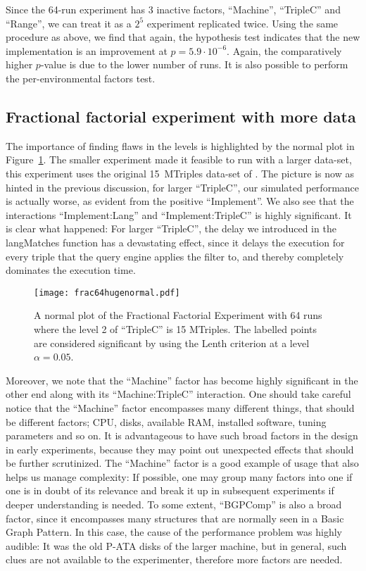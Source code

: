 \documentclass{llncs}
\begin{document}
Since the 64-run experiment has 3 inactive factors, ``Machine'',
``TripleC'' and ``Range'', we can treat it as a $2^5$ experiment
replicated twice. Using the same procedure as above, we find that
again, the hypothesis test indicates that the new implementation is an
improvement at $p = 5.9 \cdot 10^{-6}$. Again, the comparatively
higher $p$-value is due to the lower number of runs. It is also possible
to perform the per-environmental factors test.


\subsection{Fractional factorial experiment with more data}\label{sec:hugefrac}

The importance of finding flaws in the levels is highlighted by the
normal plot in Figure~\ref{fig:frac64hugenormal}. The smaller
experiment made it feasible to run with a larger data-set, this
experiment uses the original 15~MTriples data-set of
\cite{mxro:Morsey2011DBpedia}. The picture is now as hinted in the
previous discussion, for larger ``TripleC'', our simulated performance
is actually worse, as evident from the positive ``Implement''. We also
see that the interactions ``Implement:Lang'' and ``Implement:TripleC''
is highly significant. It is clear what happened: For larger
``TripleC'', the delay we introduced in the langMatches function has a
devastating effect, since it delays the execution for every triple
that the query engine applies the filter to, and thereby completely
dominates the execution time.

\begin{figure}[ht!]
  \centerline{%
  \texttt{[image: frac64hugenormal.pdf]}}
  \caption{A normal plot of the Fractional Factorial Experiment with
    64 runs where the level 2 of ``TripleC'' is 15 MTriples. The
    labelled points are considered significant by using the Lenth
    criterion at a level $\alpha=0.05$.}\label{fig:frac64hugenormal}
\end{figure}


Moreover, we note that the ``Machine'' factor has become highly
significant in the other end along with its ``Machine:TripleC''
interaction. One should take careful notice that the ``Machine''
factor encompasses many different things, that should be different
factors; CPU, disks, available RAM, installed software, tuning
parameters and so on. It is advantageous to have such broad factors in
the design in early experiments, because they may point out unexpected
effects that should be further scrutinized. The ``Machine'' factor is
a good example of usage that also helps us manage complexity: If
possible, one may group many factors into one if one is in doubt of
its relevance and break it up in subsequent experiments if deeper
understanding is needed. To some extent, ``BGPComp'' is also a broad
factor, since it encompasses many structures that are normally seen in
a Basic Graph Pattern. In this case, the cause of the performance
problem was highly audible: It was the old P-ATA disks of the larger
machine, but in general, such clues are not available to the
experimenter, therefore more factors are needed.
\end{document}
